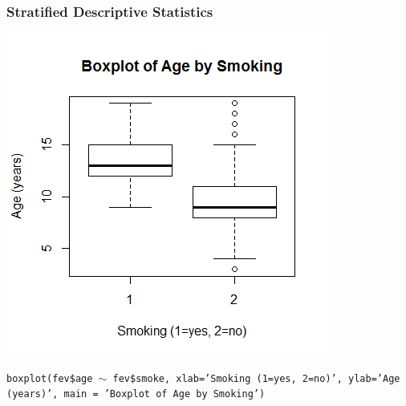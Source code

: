 \documentclass[12pt, 
hyperref={colorlinks=true, linkcolor=blue, urlcolor=cyan}]{beamer}
\begin{document}
\begin{frame}
\frametitle{Stratified Descriptive Statistics}

\vspace{-0.4cm} \center \includegraphics[height=0.6\textheight]{./boxplot-age-stratified}

\begin{scriptsize} \texttt{boxplot(fev\$age $\sim$ fev\$smoke, xlab='Smoking (1=yes, 2=no)', ylab='Age (years)', main = 'Boxplot of Age by Smoking')\\} \end{scriptsize}

\end{frame}
\end{document}
